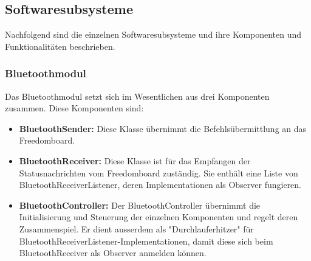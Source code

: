 \subsection{Softwaresubsysteme}
Nachfolgend sind die einzelnen Softwaresubsysteme und ihre Komponenten und Funktionalitäten beschrieben.
\subsubsection{Bluetoothmodul}
Das Bluetoothmodul setzt sich im Wesentlichen aus drei Komponenten zusammen. Diese Komponenten sind:
\begin{itemize}
	\item{\textbf{BluetoothSender:} Diese Klasse übernimmt die Befehlsübermittlung an das Freedomboard.}
	\item{\textbf{BluetoothReceiver:} Diese Klasse ist für das Empfangen der Statusnachrichten vom Freedomboard zuständig. Sie enthält eine Liste von BluetoothReceiverListener, deren Implementationen als Observer fungieren.}
	\item{\textbf{BluetoothController:} Der BluetoothController übernimmt die Initialisierung und Steuerung der einzelnen Komponenten und regelt deren Zusammenspiel. Er dient ausserdem als "Durchlauferhitzer" für BluetoothReceiverListener-Implementationen, damit diese sich beim BluetoothReceiver als Observer anmelden können.}
\end{itemize}